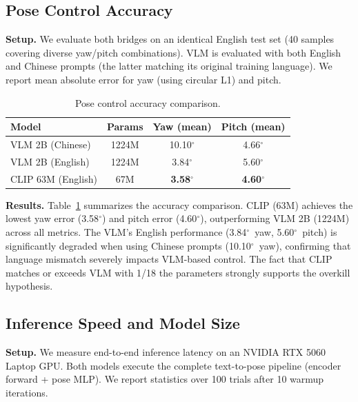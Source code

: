 \documentclass[10pt,twocolumn,letterpaper]{article}
\begin{document}
\subsection{Pose Control Accuracy}
\label{sec:exp_acc}

\textbf{Setup.} We evaluate both bridges on an identical English test set (40 samples covering diverse yaw/pitch combinations). VLM is evaluated with both English and Chinese prompts (the latter matching its original training language). We report mean absolute error for yaw (using circular L1) and pitch.

\begin{table}[t]
\centering
\caption{Pose control accuracy comparison.}
\label{tab:pose_acc}
\begin{tabular}{lccc}
\toprule
Model & Params & Yaw (mean) & Pitch (mean) \\
\midrule
VLM 2B (Chinese) & 1224M & 10.10$^\circ$ & 4.66$^\circ$ \\
VLM 2B (English) & 1224M & 3.84$^\circ$ & 5.60$^\circ$ \\
CLIP 63M (English) & 67M & \textbf{3.58$^\circ$} & \textbf{4.60$^\circ$} \\
\bottomrule
\end{tabular}
\end{table}

\textbf{Results.} Table~\ref{tab:pose_acc} summarizes the accuracy comparison. CLIP (63M) achieves the lowest yaw error (3.58$^\circ$) and pitch error (4.60$^\circ$), outperforming VLM 2B (1224M) across all metrics. The VLM's English performance (3.84$^\circ$~yaw, 5.60$^\circ$~pitch) is significantly degraded when using Chinese prompts (10.10$^\circ$~yaw), confirming that language mismatch severely impacts VLM-based control. The fact that CLIP matches or exceeds VLM with 1/18 the parameters strongly supports the overkill hypothesis.

\subsection{Inference Speed and Model Size}
\label{sec:exp_speed}

\textbf{Setup.} We measure end-to-end inference latency on an NVIDIA RTX 5060 Laptop GPU. Both models execute the complete text-to-pose pipeline (encoder forward + pose MLP). We report statistics over 100 trials after 10 warmup iterations.
\end{document}

